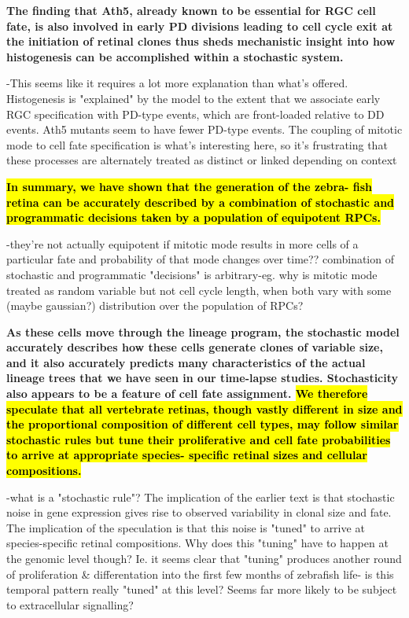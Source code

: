 \bigskip

\textbf{
 The
finding that Ath5, already known to be essential for RGC cell
fate, is also involved in early PD divisions leading to cell cycle
exit at the initiation of retinal clones thus sheds mechanistic
insight into how histogenesis can be accomplished within
a stochastic system.}

\bigskip

-This seems like it requires a lot more explanation than what's offered. Histogenesis is "explained" by the model to the extent that we associate early RGC specification with PD-type events, which are front-loaded relative to DD events. Ath5 mutants seem to have fewer PD-type events. The coupling of mitotic mode to cell fate specification is what's interesting here, so it's frustrating that these processes are alternately treated as distinct or linked depending on context

\bigskip

\textbf{\hl{
In summary, we have shown that the generation of the zebra-
fish retina can be accurately described by a combination of
stochastic and programmatic decisions taken by a population
of equipotent RPCs.}}

\bigskip

-they're not actually equipotent if mitotic mode results in more cells of a particular fate and probability of that mode changes over time?? combination of stochastic and programmatic "decisions" is arbitrary-eg. why is mitotic mode treated as random variable but not cell cycle length, when both vary with some (maybe gaussian?) distribution over the population of RPCs?

\bigskip

\textbf{
 As these cells move through the lineage
program, the stochastic model accurately describes how these
cells generate clones of variable size, and it also accurately
predicts many characteristics of the actual lineage trees that
we have seen in our time-lapse studies. Stochasticity also
appears to be a feature of cell fate assignment. \hl{We therefore
speculate that all vertebrate retinas, though vastly different in
size and the proportional composition of different cell types,
may follow similar stochastic rules but tune their proliferative
and cell fate probabilities to arrive at appropriate species-
specific retinal sizes and cellular compositions.}}

\bigskip

-what is a "stochastic rule"? The implication of the earlier text is that stochastic noise in gene expression gives rise to observed variability in clonal size and fate. The implication of the speculation is that this noise is "tuned" to arrive at species-specific retinal compositions. Why does this "tuning" have to happen at the genomic level though? Ie. it seems clear that "tuning" produces another round of proliferation \& differentation into the first few months of zebrafish life- is this temporal pattern really "tuned" at this level? Seems far more likely to be subject to extracellular signalling?

\bigskip

